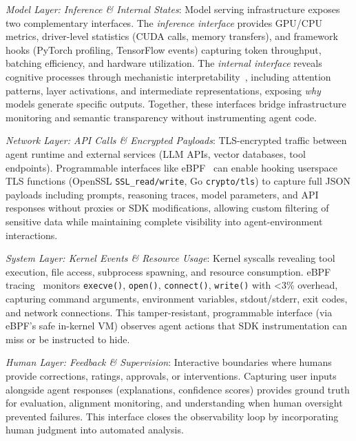 \documentclass[sigplan,screen,9pt]{acmart}
\begin{document}
\emph{Model Layer: Inference \& Internal States}: Model serving infrastructure exposes two complementary interfaces. The \emph{inference interface} provides GPU/CPU metrics, driver-level statistics (CUDA calls, memory transfers), and framework hooks (PyTorch profiling, TensorFlow events) capturing token throughput, batching efficiency, and hardware utilization. The \emph{internal interface} reveals cognitive processes through mechanistic interpretability~\cite{Kim2025AgenticInterp}, including attention patterns, layer activations, and intermediate representations, exposing \emph{why} models generate specific outputs. Together, these interfaces bridge infrastructure monitoring and semantic transparency without instrumenting agent code.

\emph{Network Layer: API Calls \& Encrypted Payloads}: TLS-encrypted traffic between agent runtime and external services (LLM APIs, vector databases, tool endpoints). Programmable interfaces like eBPF~\cite{zheng2025extending} can enable hooking userspace TLS functions (OpenSSL \texttt{SSL\_read/write}, Go \texttt{crypto/tls}) to capture full JSON payloads including prompts, reasoning traces, model parameters, and API responses without proxies or SDK modifications, allowing custom filtering of sensitive data while maintaining complete visibility into agent-environment interactions.

\emph{System Layer: Kernel Events \& Resource Usage}: Kernel syscalls revealing tool execution, file access, subprocess spawning, and resource consumption. eBPF tracing~\cite{brendangregg,ebpfio} monitors \texttt{execve()}, \texttt{open()}, \texttt{connect()}, \texttt{write()} with <3\% overhead, capturing command arguments, environment variables, stdout/stderr, exit codes, and network connections. This tamper-resistant, programmable interface (via eBPF's safe in-kernel VM) observes agent actions that SDK instrumentation can miss or be instructed to hide.

\emph{Human Layer: Feedback \& Supervision}: Interactive boundaries where humans provide corrections, ratings, approvals, or interventions. Capturing user inputs alongside agent responses (explanations, confidence scores) provides ground truth for evaluation, alignment monitoring, and understanding when human oversight prevented failures. This interface closes the observability loop by incorporating human judgment into automated analysis.
\end{document}
